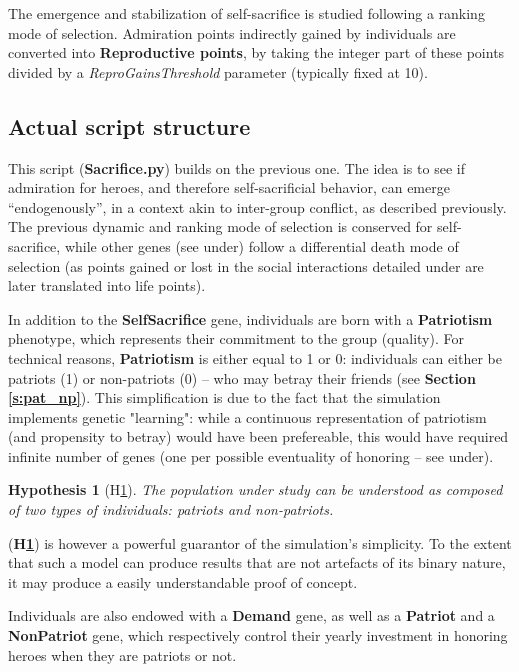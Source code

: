 \documentclass[a4paper,12pt]{report}
\newtheorem{hyp}{Hypothesis}
\begin{document}
The emergence and stabilization of self-sacrifice is studied following a
ranking mode of selection.
Admiration points indirectly gained by individuals are converted
into \textbf{Reproductive points}, by taking the integer part of these
points divided by a \emph{ReproGainsThreshold} parameter (typically fixed at 10).


\subsection{Actual script structure}
This script (\textbf{Sacrifice.py}) builds on the previous one.
The idea is to see if admiration for heroes, and therefore self-sacrificial behavior,
can emerge “endogenously”, in a context akin to inter-group conflict,
as described previously. The previous dynamic and ranking mode of selection
is conserved for self-sacrifice, while other genes (see under) follow a differential
death mode of selection (as points gained or lost in the social interactions detailed
under are later translated into life points).

In addition to the \textbf{SelfSacrifice} gene, individuals are born with a 
\textbf{Patriotism} phenotype, which represents their commitment to the group (quality).
For technical reasons, \textbf{Patriotism} is either equal to 1 or 0: individuals
can either be patriots (1) or non-patriots (0) – who may betray their friends (see
\textbf{Section \ref{s:pat_np}}). This simplification
is due to the fact that the simulation implements genetic "learning":
while a continuous representation of patriotism (and propensity to betray)
would have been prefereable, this would have required infinite number of genes
(one per possible eventuality of honoring – see under).

\begin{hyp}[H\ref{h:p_np}]
    \label{h:p_np}
    The population under study can be understood as composed of two types of individuals:
    patriots and non-patriots.
\end{hyp}

(\textbf{H\ref{h:p_np}}) is however a powerful guarantor of the simulation's
simplicity. To the extent that such a model can produce results that 
are not artefacts of its binary nature, it may produce a easily understandable
proof of concept.

Individuals are also endowed with a \textbf{Demand} gene, as well as a \textbf{Patriot}
and a \textbf{NonPatriot} gene, which respectively control their yearly
investment in honoring heroes when they are patriots or not.
\end{document}
